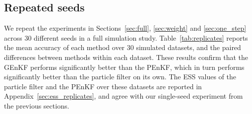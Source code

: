 \documentclass[12pt]{article}
\begin{document}
\subsection{Repeated seeds}
We repeat the experiments in Sections~\ref{sec:full}, \ref{sec:weight} and
\ref{sec:one_step} across 30 different seeds in a full simulation study.
Table~\ref{tab:replicates} reports the mean accuracy of each method over $30$
simulated datasets, and the paired differences between methods within each
dataset. These results confirm that the GEnKF performs significantly better
than the PEnKF, which in turn performs significantly better than the particle
filter on its own. The ESS values of the particle filter and the
PEnKF over these datasets are reported in Appendix~\ref{sec:ess_replicates},
and agree with our single-seed experiment from the previous sections.
\end{document}

